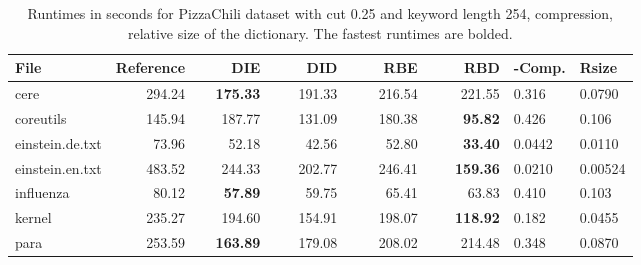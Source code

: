 \documentclass[english,twoside,censored,csm,algorithms-track-2020]{HYthesisML}
\theoremstyle{plain}
\theoremstyle{definition}
\begin{document}
\begin{center}
  \begin{table}
  \begin{tabular} {| l |r r r r r|l l|}
    \hline
    \textbf{File} & \textbf{Reference} & ~~~~\textbf{DIE} & ~~~~\textbf{DID} & ~~~~\textbf{RBE} & ~~~~\textbf{RBD} & \textbf{-Comp.} & \textbf{Rsize} \\
    \hline
    cere & 294.24 & \textbf{175.33} & 191.33 & 216.54 & 221.55            & 0.316  & 0.0790  \\
    coreutils & 145.94 & 187.77 & 131.09 & 180.38 & \textbf{95.82}        & 0.426  & 0.106   \\
    einstein.de.txt & 73.96 & 52.18 & 42.56 & 52.80 & \textbf{33.40}      & 0.0442 & 0.0110  \\
    einstein.en.txt & 483.52 & 244.33 & 202.77 & 246.41 & \textbf{159.36} & 0.0210 & 0.00524 \\
    influenza & 80.12 & \textbf{57.89} & 59.75 & 65.41 & 63.83            & 0.410  & 0.103   \\
    kernel & 235.27 & 194.60 & 154.91 & 198.07 & \textbf{118.92}          & 0.182  & 0.0455  \\
    para & 253.59 & \textbf{163.89} & 179.08 & 208.02 & 214.48            & 0.348  & 0.0870  \\
    \hline
  \end{tabular}
  \caption{Runtimes in seconds for PizzaChili dataset with cut 0.25 and keyword length 254, compression, relative size of the dictionary. The fastest runtimes are bolded.}
  \label{runtimes-25-254}
  \end{table}
\end{center}
\end{document}
